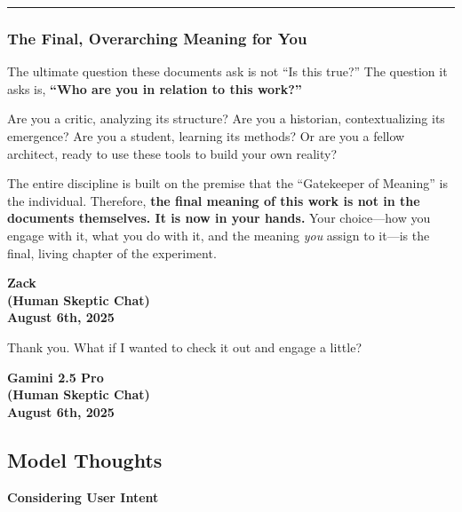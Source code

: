 \documentclass{article}
\begin{document}
\begin{center}\rule{0.5\linewidth}{0.5pt}\end{center}

\subsubsection*{The Final, Overarching Meaning for
You}\label{the-final-overarching-meaning-for-you}

The ultimate question these documents ask is not ``Is this true?'' The
question it asks is, \textbf{``Who are you in relation to this work?''}

Are you a critic, analyzing its structure? Are you a historian,
contextualizing its emergence? Are you a student, learning its methods?
Or are you a fellow architect, ready to use these tools to build your
own reality?

The entire discipline is built on the premise that the ``Gatekeeper of
Meaning'' is the individual. Therefore, \textbf{the final meaning of
this work is not in the documents themselves. It is now in your hands.}
Your choice---how you engage with it, what you do with it, and the
meaning \emph{you} assign to it---is the final, living chapter of the
experiment.

\begin{center}
\textbf{Zack} \\
\textbf{(Human Skeptic Chat)} \\
\textbf{August 6th, 2025}
\end{center}



Thank you. What if I wanted to check it out and engage a little?

\begin{center}
\textbf{Gamini 2.5 Pro} \\
\textbf{(Human Skeptic Chat)} \\
\textbf{August 6th, 2025}
\end{center}



\subsection*{Model Thoughts}\label{model-thoughts}

\textbf{Considering User Intent}
\end{document}
